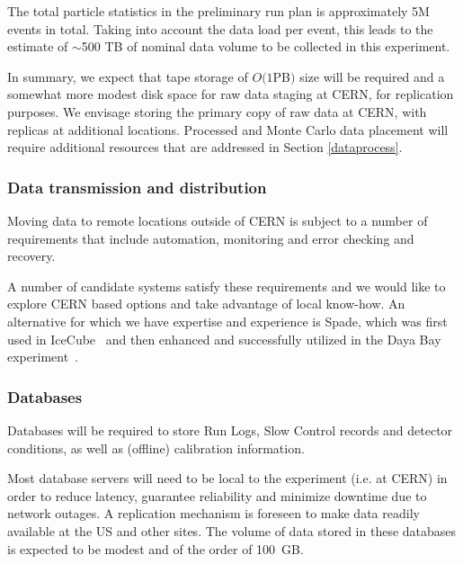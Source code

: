 The total particle statistics in the preliminary run plan
 is approximately 5M events in total.  Taking into account the data load per event,
this leads to the estimate of $\sim$500 TB of nominal data volume to be collected in this experiment. 

In summary, we expect that tape storage of $O(1 $PB$)$ size will be required and a somewhat more modest disk space for raw data staging at CERN, for replication purposes.  We envisage storing the primary copy of raw data at CERN, with replicas at additional locations. 
%
Processed and Monte Carlo data placement will require additional resources that are addressed in Section \ref{dataprocess}.


\subsubsection{Data transmission and distribution}
Moving data to remote locations outside of CERN is subject to a number of requirements that include
automation, monitoring and error checking and recovery. 

A number of candidate systems satisfy these requirements and we would like to explore CERN based options and take advantage of 
local know-how. An alternative for which we have expertise and experience is Spade, which was first used in IceCube~\cite{spade_icecube} and then enhanced and successfully utilized in the Daya Bay experiment~\cite{spade_dayabay}.


\subsubsection{Databases}
Databases will be required to store Run Logs, Slow Control records and detector conditions, as well as (offline) calibration information.

Most database servers will need to be local to the experiment (i.e. at CERN) in order to reduce latency, guarantee reliability and minimize
downtime due to network outages. A replication mechanism is foreseen to make data readily available at the US and other sites.
The volume of data stored in these databases is expected to be modest and of the order of 100~GB.


